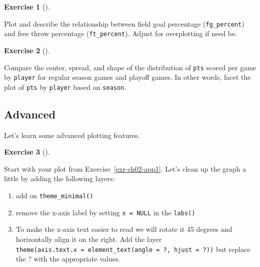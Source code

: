 \documentclass[
  letterpaper,
  DIV=11,
  numbers=noendperiod]{scrreprt}
\providecommand{\tightlist}{%
  \setlength{\itemsep}{0pt}\setlength{\parskip}{0pt}}\usepackage{longtable,booktabs,array}
\theoremstyle{definition}
\newtheorem{exercise}{Exercise}[chapter]
\theoremstyle{remark}
\begin{document}
\begin{exercise}[]\protect\hypertarget{exr-ch02-app3}{}\label{exr-ch02-app3}

Plot and describe the relationship between field goal percentage
(\texttt{fg\_percent}) and free throw percentage (\texttt{ft\_percent}).
Adjust for overplotting if need be.

\end{exercise}

\begin{exercise}[]\protect\hypertarget{exr-ch02-app4}{}\label{exr-ch02-app4}

Compare the center, spread, and shape of the distribution of
\texttt{pts} scored per game by \texttt{player} for regular season games
and playoff games. In other words, facet the plot of \texttt{pts} by
\texttt{player} based on \texttt{season}.

\end{exercise}

\hypertarget{sec-ex02-advanced}{%
\subsection{Advanced}\label{sec-ex02-advanced}}

Let's learn some advanced plotting features.

\begin{exercise}[]\protect\hypertarget{exr-ch02-adv1}{}\label{exr-ch02-adv1}

Start with your plot from Exercise~\ref{exr-ch02-app1}. Let's clean up
the graph a little by adding the following layers:

\begin{enumerate}
\def\labelenumi{\alph{enumi})}
\tightlist
\item
  add on \texttt{theme\_minimal()}
\item
  remove the x-axis label by setting \texttt{x\ =\ NULL} in the
  \texttt{labs()}
\item
  To make the x-axis text easier to read we will rotate it 45 degrees
  and horizontally align it on the right. Add the layer
  \texttt{theme(axis.text.x\ =\ element\_text(angle\ =\ ?,\ hjust\ =\ ?))}
  but replace the ? with the appropriate values.
\end{enumerate}

\end{exercise}
\end{document}
